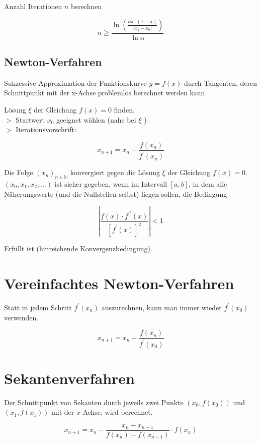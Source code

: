 Anzahl Iterationen $n$ berechnen

$$
n \geq \frac{\ln \left(\frac{t o l \cdot(1-\alpha)}{\left|x_{1}-x_{0}\right|}\right)}{\ln \alpha}
$$

\subsection{Newton-Verfahren}

Sukzessive Approximation der Funktionskurve $y=f(x)$ durch Tangenten, deren Schnittpunkt mit der x-Achse problemlos berechnet werden kann

Lösung $\xi$ der Gleichung $f(x)=0$ finden.\\
$>$ Startwert $x_{0}$ geeignet wählen (nahe bei $\xi$ )\\
$>$ Iterationsvorschrift:

$$
x_{n+1}=x_{n}-\frac{f\left(x_{n}\right)}{f^{\prime}\left(x_{n}\right)}
$$

Die Folge $\left(x_{n}\right)_{n \in \mathbb{N}}$ konvergiert gegen die Lösung $\xi$ der Gleichung $f(x)=0$.\\
$\left(x_{0}, x_{1}, x_{2}, \ldots\right)$ ist sicher gegeben, wenn im Intervall $[a, b]$, in dem alle Näherungswerte (und die Nullstellen selbst) liegen sollen, die Bedingung

$$
\left|\frac{f(x) \cdot f^{\prime \prime}(x)}{\left[f^{\prime}(x)\right]^{2}}\right|<1
$$

Erfüllt ist (hinreichende Konvergenzbedingung).

\section*{Vereinfachtes Newton-Verfahren}
Statt in jedem Schritt $f^{\prime}\left(x_{n}\right)$ auszurechnen, kann man immer wieder $f^{\prime}\left(x_{0}\right)$ verwenden.

$$
x_{n+1}=x_{n}-\frac{f\left(x_{n}\right)}{f^{\prime}\left(x_{0}\right)}
$$

\section*{Sekantenverfahren}
Der Schnittpunkt von Sekanten durch jeweils zwei Punkte $\left(x_{0}, f\left(x_{0}\right)\right)$ und $\left(x_{1}, f\left(x_{1}\right)\right)$ mit der $x$-Achse, wird berechnet.

$$
x_{n+1}=x_{n}-\frac{x_{n}-x_{n-1}}{f\left(x_{n}\right)-f\left(x_{n-1}\right)} \cdot f\left(x_{n}\right)
$$

